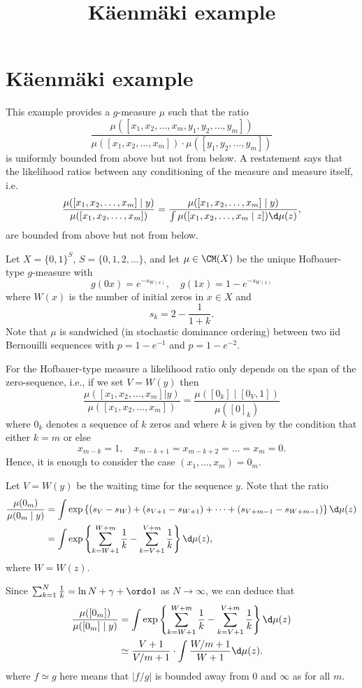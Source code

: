 \documentclass[12pt]{scrartcl}
\title{Käenmäki example}
\begin{document}
\section*{Käenmäki example}
This example provides a $g$-measure $\mu$ such that the ratio
\[
  \frac{\mu([x_1,x_2,\dots,x_m,y_1,y_2,\dots,y_m])}
  {\mu([x_1,x_2,\dots,x_m])\cdot \mu([y_1,y_2,\dots,y_m])}
\]
is uniformly bounded from above but not from below. A restatement says that the
likelihood ratios between any conditioning of the measure and measure itself,
i.e.  
\[
\frac{\mu([x_1,x_2,\dots,x_m] \mid y)}{\mu([x_1,x_2,\dots,x_m])} = 
\frac{\mu([x_1,x_2,\dots,x_m] \mid y)}{\int\mu([x_1,x_2,\dots,x_m \mid z])\d\mu(z)},
\]
are bounded from above but not from below. 

Let $X=\{0,1\}^S$, $S=\{0,1,2,\dots\}$, and let $\mu\in\CM(X)$ be the unique
Hofbauer-type $g$-measure with
\[ g(0x) = e^{-s_{W(x)}},\quad g(1x) = 1 - e^{-s_{W(x)}} \]
where $W(x)$ is the number of initial zeros in $x\in X$ and 
\[
  s_k = 2-\frac1{1+k}.
\]
Note that $\mu$ is sandwiched (in stochastic dominance ordering) between two iid
Bernouilli sequences with $p=1-e^{-1}$ and $p=1-e^{-2}$.

For the Hofbauer-type measure a likelihood ratio only
depends on the span of the zero-sequence, i.e., if we set $V=W(y)$ then 
\[
  \frac{\mu([x_1,x_2,\dots,x_m]| y)}{\mu([x_1,x_2,\dots,x_m])} 
  = \frac{\mu\left([0_{k}] \mid [0_{V}, 1]\right)}{\mu([0]_k)}
\]
where $0_k$ denotes a
sequence of $k$ zeros and where $k$ is given by the condition that either $k=m$
or else
\[
  x_{m-k}=1,\quad x_{m-k+1}=x_{m-k+2}=\dots=x_{m}=0.
\]
Hence, it is enough to
consider the case $(x_1,\dots,x_m)=0_m$.

Let $V=W(y)$ be the waiting time for the sequence $y$. Note that the ratio
\begin{align*}
  \frac{\mu(0_m)}{\mu(0_m\mid y)}
  &=
    \int \exp\left\{ (s_V-s_W) + (s_{V+1}-s_{W+1}) + \dots + (s_{V+m-1}-s_{W+m-1}) 
    \right\} \d\mu(z)
  \\
  &=
    \int \exp\left\{ \sum_{k=W+1}^{W+m} \frac 1k - \sum_{k=V+1}^{V+m}\frac 1k \right\}
    \d\mu(z),
\end{align*}
where $W=W(z)$. 

Since $\sum_{k=1}^N \frac 1k = \ln N + \gamma +\ordo1$ as
$N\to\infty$, we can deduce that
\begin{align*}
  \frac{\mu([0_m])}{\mu([0_m]\mid y)}
  &= 
  \int \exp\left\{ \sum_{k=W+1}^{W+m} \frac 1k - \sum_{k=V+1}^{V+m}\frac 1k \right\} \d\mu(z) \\
  &\simeq 
  \frac{V+1}{V/m+1}\cdot \int \frac{W/m+1}{W+1} \d\mu(z).
\end{align*}
where $f \simeq g$ here means that $|f/g|$ is bounded away from $0$ and $\infty$
as for all $m$.
\end{document}
